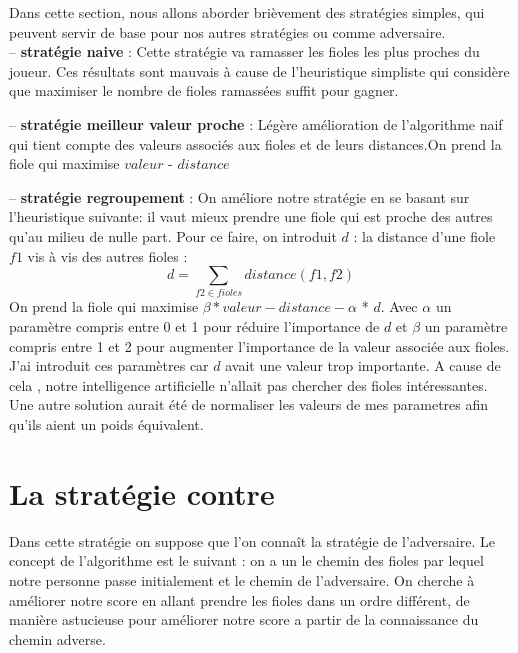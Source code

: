\documentclass[11pt]{article}
\begin{document}
Dans cette section, nous allons aborder brièvement des stratégies simples, qui peuvent servir de base pour nos autres stratégies ou comme adversaire. \\
-- \textbf {stratégie naive} : Cette stratégie va ramasser les fioles les plus proches du joueur. Ces résultats sont mauvais à cause de l'heuristique simpliste qui considère que maximiser le nombre de fioles ramassées suffit pour gagner.

-- \textbf {stratégie meilleur valeur proche} : Légère amélioration de l'algorithme naif qui tient compte des valeurs associés aux fioles et de leurs distances.On prend la fiole qui maximise $valeur$ - $distance$

-- \textbf {stratégie regroupement} : On améliore notre stratégie en se basant sur l'heuristique suivante: il vaut mieux prendre une fiole qui est proche des autres qu'au milieu de nulle part. Pour ce faire, on introduit $d$ : la distance d'une fiole $f1$ vis à vis des autres fioles : \\
\[ d = \sum_{f2 \in fioles} distance(f1,f2) \]
On prend la fiole qui maximise $\beta*valeur -distance - \alpha$ * $d$. Avec $\alpha$ un paramètre compris entre 0 et 1 pour réduire l'importance de $d$ et $\beta$ un paramètre compris entre 1 et 2 pour augmenter l'importance de la valeur associée aux fioles. J'ai introduit ces paramètres car $d$ avait une valeur trop importante. A cause de cela , notre intelligence artificielle n'allait pas chercher des fioles intéressantes. Une autre solution aurait été de normaliser les valeurs de mes parametres afin qu'ils aient un poids équivalent.

\section{La stratégie contre}

Dans cette stratégie on suppose que l'on connaît la stratégie de l'adversaire.
Le concept de l'algorithme est le suivant : on a un le chemin des fioles par lequel notre personne passe initialement et le chemin de l'adversaire. On cherche à améliorer notre score en allant prendre les fioles dans un ordre différent, de manière astucieuse pour améliorer notre score a partir de la connaissance du chemin adverse.
\end{document}
